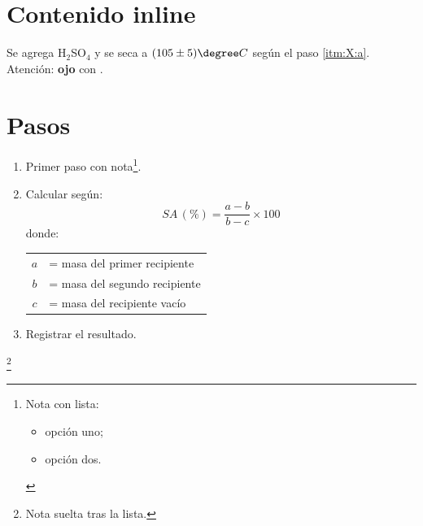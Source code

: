 

\section{Contenido inline}
Se agrega H$_2$SO$_4$ y se seca a $(105 \pm 5)\degree C$ según el paso \ref{itm:X:a}.
Atención: \textbf{ojo} con .

\section{Pasos}
\begin{enumerate}
	\item Primer paso con nota\footnote{Nota con lista:
	\begin{itemize}
		\item opción uno;
		\item opción dos.
	\end{itemize}}.
	\item Calcular según:
	\[ SA\,(\%) = \frac{a-b}{b-c} \times 100 \]
	donde:
	\begin{tabular}{cl}
	$a$ & = masa del primer recipiente \\
	$b$ & = masa del segundo recipiente \\
	$c$ & = masa del recipiente vacío
	\end{tabular}
	\item Registrar el resultado.
\end{enumerate}\footnote{Nota suelta tras la lista.}
